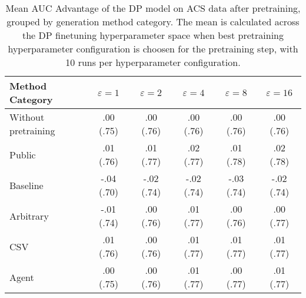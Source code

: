 \begin{table}[h!]
    \centering
    \caption{Mean AUC Advantage of the DP model on ACS data after pretraining, grouped by generation method category. The mean is calculated across the DP finetuning hyperparameter space when best pretraining hyperparameter configuration is choosen for the pretraining step, with 10 runs per hyperparameter configuration.}
    \label{tab:epsilon_comparison}
    \begin{tabular}{lccccc}
    \toprule
    Method Category & $\varepsilon=1$ & $\varepsilon=2$ & $\varepsilon=4$ & $\varepsilon=8$ & $\varepsilon=16$ \\
    \midrule
    Without pretraining & .00 {\small (.75)} & .00 {\small (.76)} & .00 {\small (.76)} & .00 {\small (.76)} & .00 {\small (.76)} \\
    \arrayrulecolor{black!50!}\midrule
    Public & \cellcolor{gold!30}.01 {\small (.76)} & \cellcolor{gold!30}.01 {\small (.77)} & \cellcolor{gold!30}.02 {\small (.77)} & \cellcolor{gold!30}.01 {\small (.78)} & \cellcolor{gold!30}.02 {\small (.78)} \\
    \arrayrulecolor{black!50!}\midrule
    Baseline & -.04 {\small (.70)} & -.02 {\small (.74)} & -.02 {\small (.74)} & -.03 {\small (.74)} & -.02 {\small (.74)} \\
    \arrayrulecolor{black!50!}\midrule
    Arbitrary & -.01 {\small (.74)} & \cellcolor{bronze!30}.00 {\small (.76)} & \cellcolor{bronze!30}.01 {\small (.77)} & .00 {\small (.76)} & .00 {\small (.77)} \\
    \arrayrulecolor{black!50!}\midrule
    CSV & \cellcolor{silver!30}.01 {\small (.76)} & \cellcolor{silver!30}.00 {\small (.76)} & \cellcolor{silver!30}.01 {\small (.77)} & \cellcolor{silver!30}.01 {\small (.77)} & \cellcolor{silver!30}.01 {\small (.77)} \\
    Agent & \cellcolor{bronze!30}.00 {\small (.75)} & \cellcolor{bronze!30}.00 {\small (.76)} & \cellcolor{bronze!30}.01 {\small (.77)} & \cellcolor{bronze!30}.00 {\small (.77)} & \cellcolor{bronze!30}.01 {\small (.77)} \\
    \bottomrule
    \end{tabular}
\end{table}